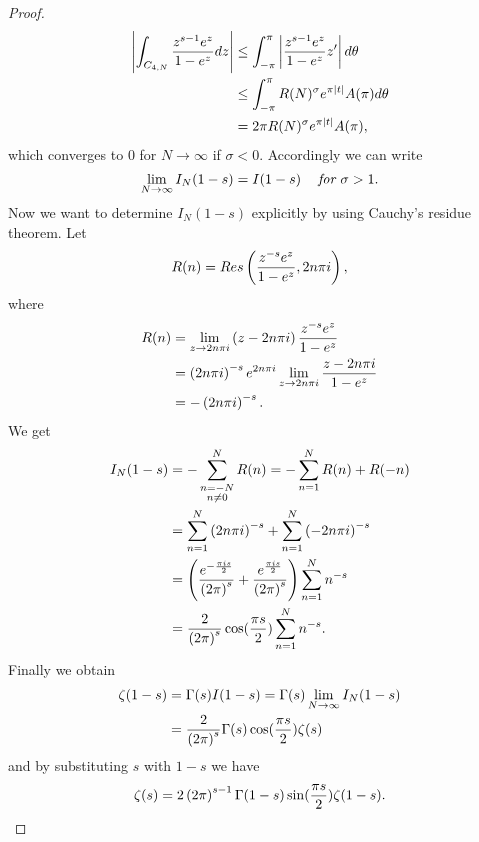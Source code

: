 \begin{proof}
\begin{equation*}
\begin{aligned}
	\left|\int_{C_{4,N}} \frac{z^{s - 1} e^z}{1 - e^z} dz\right|
	&\leq \int_{-\pi}^{\pi} \left|\frac{z^{s - 1} e^z}{1 - e^z} z^\prime\right| d\theta \\
	&\leq \int_{-\pi}^{\pi} R(N)^\sigma e^{\pi \left|t\right|} A(\pi) d\theta \\
	&= 2 \pi R(N)^\sigma e^{\pi \left|t\right|} A(\pi),
\end{aligned}
\end{equation*}
	which converges to $0$ for $N \to \infty$ if $\sigma < 0$. Accordingly we can write
\begin{equation*}
	\lim\limits_{N \to \infty} I_N(1 - s) = I(1 - s) \hspace{0.3cm} \textit{ for } \sigma > 1.
\end{equation*}
	Now we want to determine $I_N(1 - s)$ explicitly by using Cauchy's residue theorem. Let
\begin{equation*}
	R(n) = Res\left(\frac{z^{-s} e^z}{1 - e^z}, 2 n \pi i\right),
\end{equation*}
	where
\begin{equation*}
\begin{aligned}
	R(n) &= \lim\limits_{z \to 2 n \pi i} \left(z - 2 n \pi i\right) \frac{z^{-s} e^z}{1 - e^z} \\
	&= \left(2 n \pi i\right)^{-s} e^{2 n \pi i} \lim\limits_{z \to 2 n \pi i} \frac{z - 2 n \pi i}{1 - e^z} \\
	&= - \left(2 n \pi i\right)^{-s}.
\end{aligned} 
\end{equation*}
	We get
\begin{equation*}
\begin{aligned}	
	I_N(1 - s)
	&= - \sum _{\substack{n = -N \\ n \neq 0}} ^N R(n) = - \sum _{n = 1} ^N R(n) + R(-n) \\
	&= \sum _{n = 1} ^N \left(2 n \pi i\right)^{-s} + \sum _{n = 1} ^N \left(-2 n \pi i\right)^{-s} \\
	&= \left(\frac{e^{-\frac{\pi i s}{2}}}{\left(2 \pi\right)^s} + \frac{e^{\frac{\pi i s}{2}}}{\left(2 \pi\right)^s}\right) \sum _{n = 1} ^N n^{-s} \\
	&= \frac{2}{\left(2 \pi\right)^s} \cos(\frac{\pi s}{2}) \sum _{n = 1} ^N n^{-s}.
\end{aligned}
\end{equation*}
	Finally we obtain
\begin{equation*}
\begin{aligned}
	\zeta(1 - s) &= \Gamma(s) I(1 - s) = \Gamma(s) \lim\limits_{N \to \infty} I_N(1 - s) \\
	&= \frac{2}{\left(2 \pi\right)^s} \Gamma(s) \cos(\frac{\pi s}{2}) \zeta(s)
\end{aligned}
\end{equation*}
	and by substituting $s$ with $1 - s$ we have
\begin{equation*}
	\zeta(s) = 2\left(2 \pi\right)^{s - 1} \Gamma(1 - s) \sin(\frac{\pi s}{2}) \zeta(1 - s).
\end{equation*}
\end{proof}


